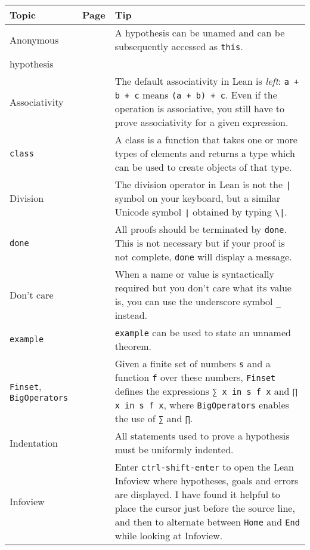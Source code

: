 \begin{tabular}{p{}|r|p{}}
\hline
Topic & Page & Tip\\
\hline
Anonymous&\pageref{p.this}&A hypothesis can be unamed and can be subsequently accessed as \Verb+this+.\\
hypothesis&\\\hline

Associativity&\pageref{p.associativity}&The default associativity in Lean is \emph{left}: \verb!a + b + c! means \verb!(a + b) + c!. Even if the operation is associative, you still have to prove associativity for a given expression.\\\hline

\Verb+class+&\pageref{p.class}&A class is a function that takes one or more types of elements and returns a type which can be used to create objects of that type.\\\hline

Division&\pageref{p.division}&The division operator in Lean is not the \Verb+|+ symbol on your keyboard, but a similar Unicode symbol \Verb+∣+ obtained by typing \Verb+\|+.\\\hline

\Verb+done+&\pageref{p.done}&All proofs should be terminated by \Verb+done+. This is not necessary but if your proof is not complete, \Verb+done+ will display a message.\\\hline

Don't care&\pageref{p.dont-care}&When a name or value is syntactically required but you don't care what its value is, you can use the underscore symbol \Verb+_+ instead.\\\hline

\Verb+example+&\pageref{p.example}&\Verb+example+ can be used to state an unnamed theorem.\\\hline

\Verb+Finset+, \Verb+BigOperators+&\pageref{p.finset}&Given a finite set of numbers \Verb+s+ and a function \Verb+f+ over these numbers, \Verb+Finset+ defines the expressions \Verb+∑ x in s f x+ and \Verb+∏ x in s f x+, where \Verb+BigOperators+ enables the use of  \Verb+∑+ and \Verb+∏+.\\\hline

Indentation&\pageref{p.indentation}&All statements used to prove a hypothesis must be uniformly indented.\\\hline

Infoview&\pageref{p.infoview}&Enter \Verb+ctrl-shift-enter+ to open the Lean Infoview where hypotheses, goals and errors are displayed. I have found it helpful to place the cursor just before the source line, and then to alternate between \Verb+Home+ and \Verb+End+ while looking at Infoview.\\\hline


\end{tabular}

